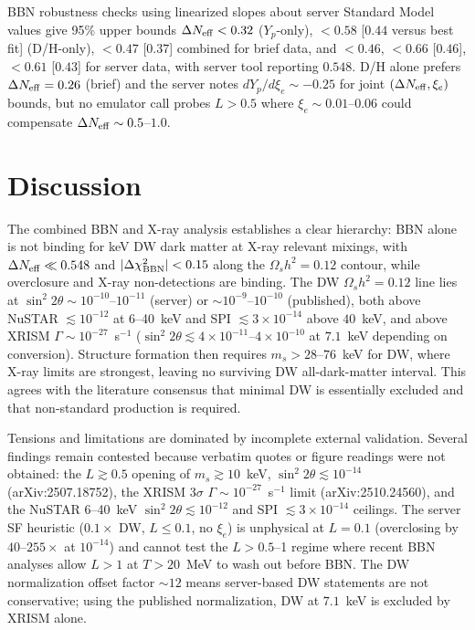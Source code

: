 \documentclass[11pt,a4paper]{article}
\begin{document}
BBN robustness checks using linearized slopes about server Standard Model values give 95\% upper bounds $\Delta N_{\rm eff}<0.32$ ($Y_{p}$-only), $<0.58$ [$0.44$ versus best fit] (D/H-only), $<0.47$ [$0.37$] combined for brief data, and $<0.46$, $<0.66$ [$0.46$], $<0.61$ [$0.43$] for server data, with server tool reporting $0.548$. D/H alone prefers $\Delta N_{\rm eff}=0.26$ (brief) and the server notes $dY_{p}/d\xi_{e}\sim-0.25$ for joint $(\Delta N_{\rm eff},\xi_{e})$ bounds, but no emulator call probes $L>0.5$ where $\xi_{e}\sim0.01$--$0.06$ could compensate $\Delta N_{\rm eff}\sim0.5$--$1.0$.

\section{Discussion}
The combined BBN and X-ray analysis establishes a clear hierarchy: BBN alone is not binding for keV DW dark matter at X-ray relevant mixings, with $\Delta N_{\rm eff}\ll0.548$ and $|\Delta\chi^{2}_{\rm BBN}|<0.15$ along the $\Omega_{s}h^{2}=0.12$ contour, while overclosure and X-ray non-detections are binding. The DW $\Omega_{s}h^{2}=0.12$ line lies at $\sin^{2}2\theta\sim10^{-10}$--$10^{-11}$ (server) or $\sim10^{-9}$--$10^{-10}$ (published), both above NuSTAR $\lesssim10^{-12}$ at $6$--40~keV and SPI $\lesssim3\times10^{-14}$ above $40$~keV, and above XRISM $\Gamma\sim10^{-27}$~s$^{-1}$ ($\sin^{2}2\theta\lesssim4\times10^{-11}$--$4\times10^{-10}$ at $7.1$~keV depending on conversion). Structure formation then requires $m_{s}>28$--$76$~keV for DW, where X-ray limits are strongest, leaving no surviving DW all-dark-matter interval. This agrees with the literature consensus that minimal DW is essentially excluded and that non-standard production is required.

Tensions and limitations are dominated by incomplete external validation. Several findings remain contested because verbatim quotes or figure readings were not obtained: the $L\gtrsim0.5$ opening of $m_{s}\gtrsim10$~keV, $\sin^{2}2\theta\lesssim10^{-14}$ (arXiv:2507.18752), the XRISM $3\sigma$ $\Gamma\sim10^{-27}$~s$^{-1}$ limit (arXiv:2510.24560), and the NuSTAR $6$--40~keV $\sin^{2}2\theta\lesssim10^{-12}$ and SPI $\lesssim3\times10^{-14}$ ceilings. The server SF heuristic ($0.1\times$ DW, $L\le0.1$, no $\xi_{e}$) is unphysical at $L=0.1$ (overclosing by $40$--$255\times$ at $10^{-14}$) and cannot test the $L>0.5$--1 regime where recent BBN analyses allow $L>1$ at $T>20$~MeV to wash out before BBN. The DW normalization offset factor $\sim12$ means server-based DW statements are not conservative; using the published normalization, DW at $7.1$~keV is excluded by XRISM alone.
\end{document}
